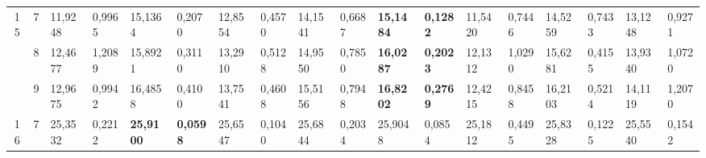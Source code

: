 \documentclass[conference]{IEEEtran}
\begin{document}
\begin{table*}[]
\begin{tabular}{|cc|ll|ll|ll|ll|ll|ll|ll|ll|}
		\multicolumn{1}{|c|}{\multirow{3}{*}{15}} & 7          & \multicolumn{1}{l|}{11,9248}           & 0,9965                            & \multicolumn{1}{l|}{15,1364}           & 0,2070                            & \multicolumn{1}{l|}{12,8554}           & 0,4570                            & \multicolumn{1}{l|}{14,1541}           & 0,6687                            & \multicolumn{1}{l|}{\textbf{15,1484}}  & \textbf{0,1282}                   & \multicolumn{1}{l|}{11,5420}           & 0,7446                            & \multicolumn{1}{l|}{14,5259}           & 0,7433                            & \multicolumn{1}{l|}{13,1248}           & 0,9271                            \\ \cline{2-18} 
		\multicolumn{1}{|c|}{}                    & 8          & \multicolumn{1}{l|}{12,4677}           & 1,2089                            & \multicolumn{1}{l|}{15,8921}           & 0,3110                            & \multicolumn{1}{l|}{13,2910}           & 0,5128                            & \multicolumn{1}{l|}{14,9550}           & 0,7850                            & \multicolumn{1}{l|}{\textbf{16,0287}}  & \textbf{0,2023}                   & \multicolumn{1}{l|}{12,1312}           & 1,0290                            & \multicolumn{1}{l|}{15,6281}           & 0,4155                            & \multicolumn{1}{l|}{13,9340}           & 1,0720                            \\ \cline{2-18} 
		\multicolumn{1}{|c|}{}                    & 9          & \multicolumn{1}{l|}{12,9675}           & 0,9942                            & \multicolumn{1}{l|}{16,4858}           & 0,4100                            & \multicolumn{1}{l|}{13,7541}           & 0,4608                            & \multicolumn{1}{l|}{15,5156}           & 0,7948                            & \multicolumn{1}{l|}{\textbf{16,8202}}  & \textbf{0,2769}                   & \multicolumn{1}{l|}{12,4215}           & 0,8458                            & \multicolumn{1}{l|}{16,2103}           & 0,5214                            & \multicolumn{1}{l|}{14,1119}           & 1,2070                            \\ \hline
		\multicolumn{1}{|c|}{\multirow{3}{*}{16}} & 7          & \multicolumn{1}{l|}{25,3532}           & 0,2212                            & \multicolumn{1}{l|}{\textbf{25,9100}}  & \textbf{0,0598}                   & \multicolumn{1}{l|}{25,6547}           & 0,1040                            & \multicolumn{1}{l|}{25,6844}           & 0,2034                            & \multicolumn{1}{l|}{25,9048}           & 0,0854                            & \multicolumn{1}{l|}{25,1812}           & 0,4495                            & \multicolumn{1}{l|}{25,8328}           & 0,1225                            & \multicolumn{1}{l|}{25,5540}           & 0,1542                            \\ \cline{2-18} 

\end{tabular}
\end{table*}
\end{document}
